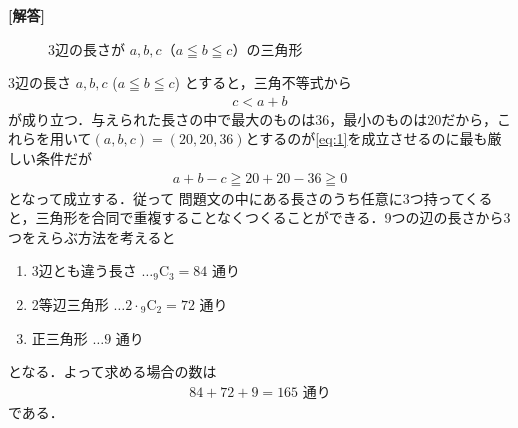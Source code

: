 \documentclass[../../main.tex]{subfiles}
\begin{document}
\begin{oframed}
  
\end{oframed}

{\bf [解答]}

\begin{figure}[htb]
  \centering
  \caption{3辺の長さが $a, b, c$（$a \leqq b \leqq c$）の三角形}
  \label{fig:1968_2_triangle}
\end{figure}

3辺の長さ $a, b, c$ ($a \leqq b \leqq c$) とすると，三角不等式から
\begin{align}
  c < a + b \label{eq:1}
\end{align}
が成り立つ．与えられた長さの中で最大のものは$36$，最小のものは$20$だから，これらを用いて$(a,b,c)=(20,20,36)$とするのが\cref{eq:1}を成立させるのに最も厳しい条件だが
\begin{align}
  a + b - c \geqq 20 + 20 - 36 \geqq 0
\end{align}
となって成立する．従って 問題文の中にある長さのうち任意に3つ持ってくると，三角形を合同で重複することなくつくることができる．9つの辺の長さから3つをえらぶ方法を考えると
\begin{enumerate}
  \item[$1^\circ$] 3辺とも違う長さ $\dots {}_9\mathrm{C}_3 = 84$ 通り
  \item[$2^\circ$] 2等辺三角形 $\dots 2 \cdot {}_9\mathrm{C}_2 = 72$ 通り
  \item[$3^\circ$] 正三角形 $\dots 9$ 通り
\end{enumerate}
となる．よって求める場合の数は
\begin{align}
  84 + 72 + 9 = 165 \text{ 通り}
\end{align}
である．

\newpage
\end{document}
